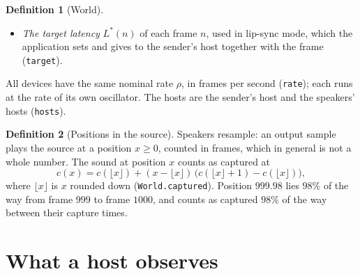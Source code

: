 \documentclass[11pt,a4paper]{article}
\newcommand{\lean}[1]{\texttt{#1}}
\theoremstyle{definition}
\newtheorem{definition}{Definition}[section]
\begin{document}
\begin{definition}[World]
\begin{itemize}
  of host $j$ handles it at a true time
  $\mathrm{deliver}_{ij}(s,q) \ge \mathrm{reach}_{ij}(s,q)$
  (\lean{deliver}). The kernel of host $j$ stamps the message with the
  reading of the host's clock when the message reaches the host; a host
  that is busy handles the message later. Delivery
  and loss may depend on $s$ and $q$, but not on the payload. Throughout
  this specification, a directed \emph{link} $(i, j)$ represents the entire
  end-to-end path between the application's send call on host $i$ and
  receive call on host $j$, covering both hosts' kernel network stacks,
  drivers, network interface cards, switches or wireless access points, and
  the wired or wireless medium.
\item \emph{The target latency} $L^*(n)$ of each frame $n$, used in
  lip-sync mode, which the application sets and gives to the sender's host
  together with the frame (\lean{target}).
\end{itemize}
All devices have the same nominal rate $\rho$, in frames per second
(\lean{rate}); each runs at the rate of its own oscillator. The hosts are
the sender's host and the speakers' hosts (\lean{hosts}).
\end{definition}

\begin{definition}[Positions in the source]
Speakers resample: an output sample plays the source at a position
$x \ge 0$, counted in frames, which in general is not a whole number. The
sound at position $x$ counts as captured at
\[
  c(x) = c(\lfloor x \rfloor) + (x - \lfloor x \rfloor)\,
         \bigl(c(\lfloor x \rfloor + 1) - c(\lfloor x \rfloor)\bigr),
\]
where $\lfloor x \rfloor$ is $x$ rounded down (\lean{World.captured}).
Position $999.98$ lies $98\%$ of the way from frame $999$ to frame $1000$,
and counts as captured $98\%$ of the way between their capture times.
\end{definition}

\section{What a host observes}
\end{document}
